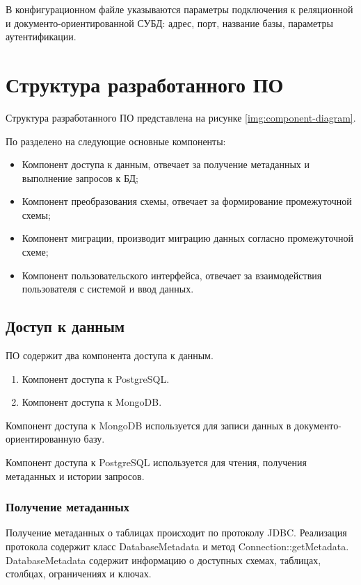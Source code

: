 В конфигурационном файле указываются параметры подключения к реляционной и документо-ориентированной СУБД:
адрес, порт, название базы, параметры аутентификации.


\clearpage
\section{Структура разработанного ПО}

Структура разработанного ПО представлена на рисунке \ref{img:component-diagram}.



По разделено на следующие основные компоненты:
\begin{itemize}[label=---]
    \item Компонент доступа к данным, отвечает за получение метаданных и выполнение запросов к БД;
    \item Компонент преобразования схемы, отвечает за формирование промежуточной схемы;
    \item Компонент миграции, производит миграцию данных согласно промежуточной схеме;
    \item Компонент пользовательского интерфейса, отвечает за взаимодействия пользователя с системой и ввод данных.
\end{itemize}

\clearpage

\subsection{Доступ к данным}

ПО содержит два компонента доступа к данным.
\begin{enumerate}
    \item Компонент доступа к PostgreSQL.
    \item Компонент доступа к MongoDB.
\end{enumerate}

Компонент доступа к MongoDB используется для записи данных в документо-ориентированную базу.

Компонент доступа к PostgreSQL используется для чтения, получения метаданных и истории запросов.

\subsubsection{Получение метаданных}
Получение метаданных о таблицах происходит по протоколу JDBC. 
Реализация протокола содержит класс \textmd{DatabaseMetadata} и метод \textmd{Connection::getMetadata}.
\textmd{DatabaseMetadata} содержит информацию о доступных схемах, таблицах, столбцах, ограничениях и ключах.

